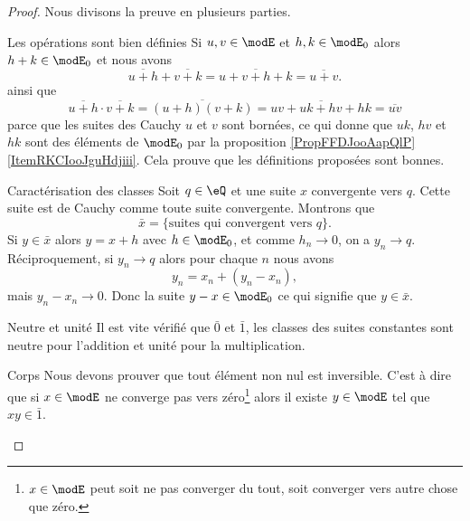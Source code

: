 \begin{proof}
    Nous divisons la preuve en plusieurs parties.
    \begin{subproof}
    \item[Les opérations sont bien définies]
    Si \( u,v\in \modE\) et \( h,k\in \modE_0\) alors \( h+k\in\modE_0\) et nous avons 
    \begin{equation}
        \overline{ u+h }+\overline{ v+k }=\overline{ u+v+h+k }=\overline{ u+v }.
    \end{equation}
    ainsi que
    \begin{equation}
        \overline{ u+h }\cdot \overline{ v+k }=\overline{ (u+h)(v+k) }=\overline{ uv+uk+hv+hk }=\overline{ uv }
    \end{equation}
    parce que les suites des Cauchy \( u\) et \( v\) sont bornées, ce qui donne que \( uk\), \( hv\) et \( hk\) sont des éléments de \( \modE_0\) par la proposition \ref{PropFFDJooAapQlP}\ref{ItemRKCIooJguHdjiii}. Cela prouve que les définitions proposées sont bonnes.

    \item[Caractérisation des classes]
        Soit \( q\in \eQ\) et une suite \( x\) convergente vers \( q\). Cette suite est de Cauchy comme toute suite convergente. Montrons que
        \begin{equation}
            \bar x=\{ \text{suites qui convergent vers } q \}.
        \end{equation}
        Si \( y\in\bar x\) alors \( y=x+h\) avec \( h\in \modE_0\), et comme \( h_n\to 0\), on a \( y_n\to q\). Réciproquement, si \( y_n\to q\) alors pour chaque \( n\) nous avons
        \begin{equation}
            y_n=x_n+(y_n-x_n),
        \end{equation}
        mais \( y_n-x_n\to 0\). Donc la suite \( y-x\in\modE_0\) ce qui signifie que \( y\in\bar x\).
    \item[Neutre et unité]
        Il est vite vérifié que \( \bar 0\) et \( \bar 1\), les classes des suites constantes sont neutre pour l'addition et unité pour la multiplication.
    \item[Corps]
        Nous devons prouver que tout élément non nul est inversible. C'est à dire que si \( x\in\modE\) ne converge pas vers zéro\footnote{\( x\in\modE\) peut soit ne pas converger du tout, soit converger vers autre chose que zéro.} alors il existe \( y\in \modE\) tel que \( xy\in\bar 1\). 


\end{subproof}
\end{proof}
